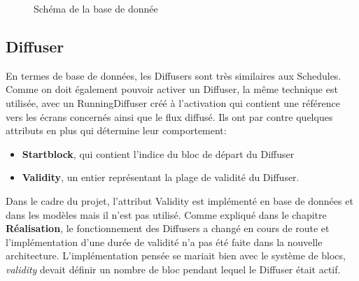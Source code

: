 \documentclass[french]{article}
\begin{document}
\begin{landscape}
\begin{figure}[!h]
\centering
{}
\caption{Schéma de la base de donnée}
\end{figure}
\end{landscape}
    
\newpage
\subsection{Diffuser}	

En termes de base de données, les Diffusers sont très similaires aux Schedules. Comme on doit également pouvoir activer un Diffuser, la même technique est utilisée, avec un RunningDiffuser créé à l'activation qui contient une référence vers les écrans concernés ainsi que le flux diffusé. Ils ont par contre quelques attributs en plus qui détermine leur comportement:
\begin{itemize}
	\item \textbf{Startblock}, qui contient l'indice du bloc de départ du Diffuser
	\item \textbf{Validity}, un entier représentant la plage de validité du Diffuser. 
\end{itemize}

Dans le cadre du projet, l'attribut Validity est implémenté en base de données et dans les modèles mais il n'est pas utilisé. Comme expliqué dans le chapitre \textbf{Réalisation}, le fonctionnement des Diffusers a changé en cours de route et l'implémentation d'une durée de validité n'a pas été faite dans la nouvelle architecture. L'implémentation pensée se mariait bien avec le système de blocs, \textit{validity} devait définir un nombre de bloc pendant lequel le Diffuser était actif.
\end{document}
